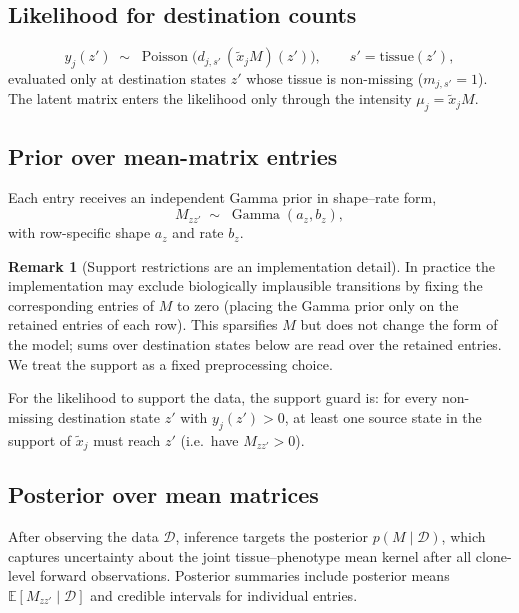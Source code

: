 \documentclass[11pt]{article}
\newcommand{\Dsp}{\mathcal{D}}                    %
\newcommand{\E}{\mathbb{E}}
\DeclareMathOperator{\Pois}{Poisson}
\DeclareMathOperator{\Gam}{Gamma}
\theoremstyle{definition}
\newtheorem*{remark}{Remark}
\begin{document}
\subsection{Likelihood for destination counts}

\begin{keybox}[title={Observation likelihood}]
\[
  y_j(z') \;\sim\; \Pois\!\bigl( d_{j,s'}\, (\tilde{x}_j M)(z') \bigr),
  \qquad s' = \mathrm{tissue}(z'),
\]
evaluated only at destination states $z'$ whose tissue is non-missing
($m_{j,s'} = 1$). The latent matrix enters the likelihood only through the
intensity
$\mu_j = \tilde{x}_j M$.
\end{keybox}

\subsection{Prior over mean-matrix entries}

Each entry receives an independent Gamma prior in shape--rate form,
\[
  M_{zz'} \;\sim\; \Gam(a_z, b_z),
\]
with row-specific shape $a_z$ and rate $b_z$.

\begin{remark}[Support restrictions are an implementation detail]
In practice the implementation may exclude biologically implausible transitions
by fixing the corresponding entries of $M$ to zero (placing the Gamma prior only
on the retained entries of each row). This sparsifies $M$ but does not change
the form of the model; sums over destination states below are read over the
retained entries. We treat the support as a fixed preprocessing choice.
\end{remark}

For the likelihood to support the data, the support guard is: for every
non-missing destination state $z'$ with $y_j(z') > 0$, at least one source state
in the support of $\tilde{x}_j$ must reach $z'$ (i.e.\ have $M_{zz'} > 0$).

\subsection{Posterior over mean matrices}

After observing the data $\Dsp$, inference targets the posterior
$p(M \mid \Dsp)$, which captures uncertainty about the joint tissue--phenotype
mean kernel after all clone-level forward observations. Posterior summaries
include posterior means $\E[M_{zz'} \mid \Dsp]$ and credible intervals for
individual entries.
\end{document}
